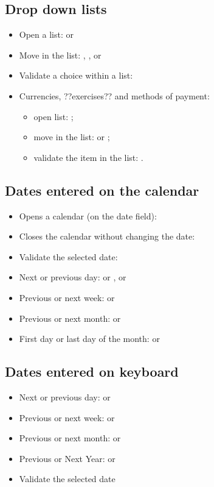 \subsection{Drop down lists}

\begin{itemize}
	 \item Open a list:  or 
	 \item Move in the list: , ,  or 
	 \item Validate a choice within a list: 
	 \item Currencies, ??exercises?? and methods of payment:
		\begin{itemize}
			\item open list: ; 
			\item move in the list:  or ;
			\item validate the item in the list: .
		\end{itemize}
\end{itemize}


\subsection{Dates entered on the calendar}

\begin{itemize}
	\item Opens a calendar (on the date field): 
	\item Closes the calendar without changing the date: 
	\item Validate the selected date: 
	\item Next or previous day: \key{+} or \key{-},  or 
	\item Previous or next week:  or 
	\item Previous or next month:  or 
	\item First day or last day of the month:  or 
\end{itemize}


\subsection{Dates entered on keyboard }

\begin{itemize}
	\item Next or previous day: \key{+} or \key{-}
	\item Previous or next week:  \key{+} or  \key{-}
	\item Previous or next month:  or 
	\item Previous or Next Year:   or  
	\item Validate the selected date 
\end{itemize}


